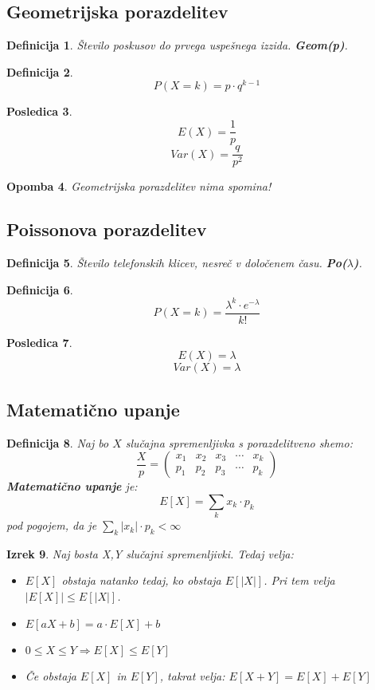 \documentclass[11pt]{article}
\newtheorem{Izrek}{{\sc Izrek}}[section]
\newtheorem{Posledica}[Izrek]{{\sc Posledica}}
\newtheorem{Definicija}[Izrek]{{\sc Definicija}}
\newtheorem{Opomba}[Izrek]{{\sc Opomba}}
\begin{document}
	\subsection{Geometrijska porazdelitev}
	\begin{Definicija}
		Število poskusov do prvega uspešnega izzida. \textbf{Geom(p)}.
	\end{Definicija}
	\begin{Definicija}
		$$P(X=k) = p \cdot q^{k-1}$$
	\end{Definicija}
	\begin{Posledica}
		$$E(X) = \frac{1}{p}$$
		$$Var(X) = \frac{q}{p^2}$$
	\end{Posledica}
	\begin{Opomba}
		Geometrijska porazdelitev nima spomina!
	\end{Opomba}
	\subsection{Poissonova porazdelitev}
	\begin{Definicija}
		Število telefonskih klicev, nesreč v določenem času. \textbf{Po($\lambda$)}.
	\end{Definicija}
	\begin{Definicija}
		$$P(X=k) = \frac{\lambda^k \cdot e^{-\lambda}}{k!}$$
	\end{Definicija}
	\begin{Posledica}
		$$E(X) = \lambda$$
		$$Var(X) = \lambda$$
	\end{Posledica}
	\subsection{Matematično upanje}
	\begin{Definicija}
		Naj bo $X$ slučajna spremenljivka s porazdelitveno shemo:
		\[
		\frac{X}{p} = \begin{pmatrix}
		x_1 & x_2 & x_3 & \cdots & x_k \\       p_1 & p_2 & p_3 & \cdots & p_k
		\end{pmatrix}
		\]
		\textbf{Matematično upanje} je:
		$$ E[X] = \sum_{k}{x_k \cdot p_k}$$
		pod pogojem, da je $\sum_{k}{|x_k|\cdot p_k} < \infty$
	\end{Definicija}
	\begin{Izrek}
		Naj bosta X,Y slučajni spremenljivki. Tedaj velja:
		\begin{itemize}
			\item
			$ E[X]$ obstaja natanko tedaj, ko obstaja $ E[|X|]$. Pri tem velja $|E[X]| \le E[|X|]$.
			\item
			$ E[aX+b] = a \cdot  E[X] + b$
			\item
			$0 \le X \le Y \Rightarrow  E[X] \le  E[Y]$
			\item
			Če obstaja $ E[X]$ in $ E[Y]$, takrat velja: $ E[X+Y] =  E[X] +  E[Y]$ 
		\end{itemize}
	\end{Izrek}
\end{document}
